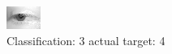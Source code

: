 \begin{figure}[h!]
\begin{center}
\includegraphics[width=0.60\columnwidth]{figures/ID2638_class_3_target_4.png}
\end{center}
\caption{ Classification: 3 actual target: 4}
\label{fig:ID2638_class_3_target_4}
\end{figure}
